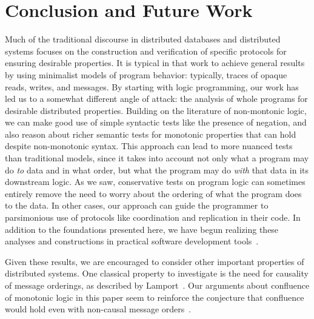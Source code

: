 \section{Conclusion and Future Work}
\label{sec:conclusion}
Much of the traditional discourse in distributed databases and distributed systems focuses on the construction and verification of specific protocols for ensuring desirable properties.  It is typical in that work to achieve general results by using minimalist models of program behavior: typically, traces of opaque reads, writes, and messages.  By starting with logic programming, our work has led us to a somewhat different angle of attack: the analysis of whole programs for desirable distributed properties.  Building on the literature of non-montonic logic, we can make good use of simple syntactic tests like the presence of negation, and also reason about richer semantic tests for monotonic properties that can hold despite non-monotonic syntax.   This approach can lead to more nuanced tests than traditional models, since it takes into account not only what a program may do \emph{to} data and in what order, but what the program may do \emph{with} that data in its downstream logic.    As we saw, conservative tests on program logic  can sometimes entirely remove the need to worry about the ordering of what the program does to the data.  In other cases, our approach can guide the programmer to parsimonious use of protocols like coordination and replication in their code.    In addition to the foundations presented here, we have begun realizing these analyses and constructions in practical software development tools~\cite{cidr11}.

Given these results, we are encouraged to consider other important properties of distributed systems.  One classical property to investigate is the need for causality of message orderings, as described by Lamport~\cite{timeclocks}.  Our arguments about confluence of monotonic logic in this paper seem to reinforce the conjecture that confluence would hold even with non-causal message orders~\cite{declarative-imperative}.  


